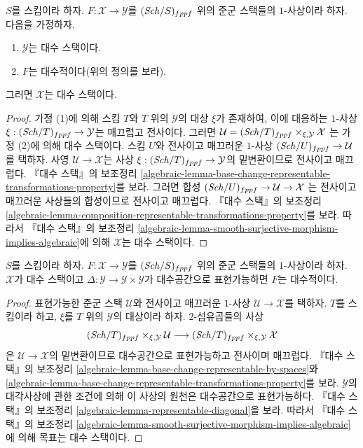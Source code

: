 \begin{lemma}
\label{lemma-algebraic-morphism-to-algebraic}
$S$를 스킴이라 하자.
$F : \mathcal{X} \to \mathcal{Y}$를 $(\mathit{Sch}/S)_{fppf}$ 위의
준군 스택들의 $1$-사상이라 하자. 다음을 가정하자.
\begin{enumerate}
\item $\mathcal{Y}$는 대수 스택이다.
\item $F$는 대수적이다(위의 정의를 보라).
\end{enumerate}
그러면 $\mathcal{X}$는 대수 스택이다.
\end{lemma}

\begin{proof}
가정 (1)에 의해 스킴 $T$와 $T$ 위의 $\mathcal{Y}$의 대상 $\xi$가
존재하여, 이에 대응하는 $1$-사상
$\xi : (\mathit{Sch}/T)_{fppf} \to \mathcal{Y}$는 매끄럽고 전사이다. 그러면
$\mathcal{U} = (\mathit{Sch}/T)_{fppf} \times_{\xi, \mathcal{Y}} \mathcal{X}$
는 가정 (2)에 의해 대수 스택이다.
스킴 $U$와 전사이고 매끄러운 $1$-사상
$(\mathit{Sch}/U)_{fppf} \to \mathcal{U}$를 택하자.
사영 $\mathcal{U} \longrightarrow \mathcal{X}$는
사상 $\xi : (\mathit{Sch}/T)_{fppf} \to \mathcal{Y}$의 밑변환이므로
전사이고 매끄럽다. 『대수 스택』의 보조정리
\ref{algebraic-lemma-base-change-representable-transformations-property}를
보라. 그러면 합성
$(\mathit{Sch}/U)_{fppf} \to \mathcal{U} \to \mathcal{X}$
는 전사이고 매끄러운 사상들의 합성이므로 전사이고 매끄럽다.
『대수 스택』의 보조정리
\ref{algebraic-lemma-composition-representable-transformations-property}를
보라. 따라서 『대수 스택』의 보조정리
\ref{algebraic-lemma-smooth-surjective-morphism-implies-algebraic}에 의해
$\mathcal{X}$는 대수 스택이다.
\end{proof}

\begin{lemma}
\label{lemma-map-from-algebraic}
$S$를 스킴이라 하자. $F : \mathcal{X} \to \mathcal{Y}$를
$(\mathit{Sch}/S)_{fppf}$ 위의 준군 스택들의 $1$-사상이라 하자.
$\mathcal{X}$가 대수 스택이고
$\Delta : \mathcal{Y} \to \mathcal{Y} \times \mathcal{Y}$가
대수공간으로 표현가능하면 $F$는 대수적이다.
\end{lemma}

\begin{proof}
표현가능한 준군 스택 $\mathcal{U}$와 전사이고 매끄러운 $1$-사상
$\mathcal{U} \to \mathcal{X}$를 택하자. $T$를 스킴이라 하고,
$\xi$를 $T$ 위의 $\mathcal{Y}$의 대상이라 하자. $2$-섬유곱들의 사상
$$
(\mathit{Sch}/T)_{fppf} \times_{\xi, \mathcal{Y}} \mathcal{U}
\longrightarrow
(\mathit{Sch}/T)_{fppf} \times_{\xi, \mathcal{Y}} \mathcal{X}
$$
은 $\mathcal{U} \to \mathcal{X}$의 밑변환이므로 대수공간으로
표현가능하고 전사이며 매끄럽다. 『대수 스택』의 보조정리
\ref{algebraic-lemma-base-change-representable-by-spaces}와
\ref{algebraic-lemma-base-change-representable-transformations-property}를
보라. $\mathcal{Y}$의 대각사상에 관한 조건에 의해 이 사상의 원천은
대수공간으로 표현가능하다. 『대수 스택』의 보조정리
\ref{algebraic-lemma-representable-diagonal}을 보라.
따라서 『대수 스택』의 보조정리
\ref{algebraic-lemma-smooth-surjective-morphism-implies-algebraic}에 의해
목표는 대수 스택이다.
\end{proof}

